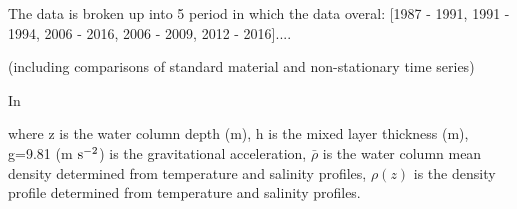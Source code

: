 The data is broken up into 5 period in which the data overal: [1987 - 1991, 1991 - 1994, 2006 - 2016, 2006 - 2009, 2012 - 2016]....



























(including comparisons of standard material and non-stationary time series)  











In














\noindent where z is the water column depth (m), h is the mixed layer thickness (m), g=9.81 (m $\rm s^{-2}$) is the gravitational acceleration, $\bar{\rho}$ is the water column mean density determined from temperature and salinity profiles, $\rho(z)$ is the density profile determined from temperature and salinity 
profiles. 